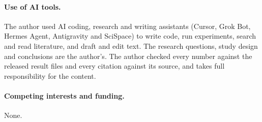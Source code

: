 \documentclass[10pt,twocolumn,letterpaper]{article}
\begin{document}
\paragraph{Use of AI tools.} The author used AI coding, research and writing assistants (Cursor, Grok Bot, Hermes Agent, Antigravity and SciSpace) to write code, run experiments, search and read literature, and draft and edit text. The research questions, study design and conclusions are the author's. The author checked every number against the released result files and every citation against its source, and takes full responsibility for the content.
\paragraph{Competing interests and funding.} None.
\end{document}
